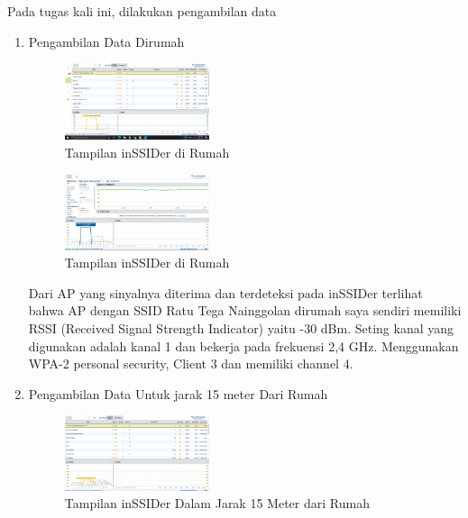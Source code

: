 \documentclass[conference]{IEEEtran}
\begin{document}
    Pada tugas kali ini, dilakukan pengambilan data
    \begin{enumerate}
    \vspace{0.2cm}
    
        \item Pengambilan Data Dirumah
        
    \begin{figure}[h]
        \centering
        \includegraphics[width=0.4\textwidth]{8.png}
        \caption{Tampilan inSSIDer di Rumah}
    \end{figure}
    
    \begin{figure}[h]
        \centering
        \includegraphics[width=0.4\textwidth]{9.png}
        \caption{Tampilan inSSIDer di Rumah}
    \end{figure}
    \vspace{0.3cm}
    
    Dari AP yang sinyalnya diterima dan terdeteksi pada inSSIDer terlihat bahwa AP dengan SSID Ratu Tega Nainggolan dirumah saya sendiri memiliki RSSI (Received Signal Strength Indicator) yaitu -30 dBm. Seting kanal yang digunakan adalah kanal 1 dan bekerja pada frekuensi 2,4 GHz. Menggunakan WPA-2 personal security, Client 3 dan memiliki channel 4.
    
    \vspace{0.3cm}
    
        \item Pengambilan Data Untuk jarak 15 meter Dari Rumah
        
    \begin{figure}[h]
        \centering
        \includegraphics[width=0.4\textwidth]{10.png}
        \caption{Tampilan inSSIDer Dalam Jarak 15 Meter dari Rumah}
    \end{figure}
    

\end{enumerate}
\end{document}
